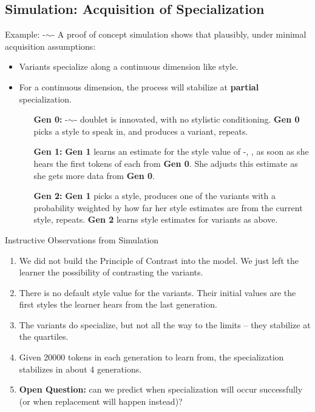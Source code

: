 \documentclass[hyperref={pdfpagelabels=false}]{beamer}
\begin{document}
\subsection{Simulation: Acquisition of Specialization}
\begin{frame}{Example: -$\sim$-}
	A proof of concept simulation shows that plausibly, under minimal acquisition assumptions:
	\begin{itemize}
	\item Variants specialize along a continuous dimension like style.
	\item For a continuous dimension, the process will stabilize at \textbf{partial} specialization. 
	\item[ ] \begin{itemize}
		\item[\textbf{Gen 0:}]  -$\sim$- doublet is innovated, with no stylistic conditioning. \textbf{Gen 0} picks a style to speak in, and produces a variant, repeats. 
		\item[\textbf{Gen 1:}]  \textbf{Gen 1} learns an estimate for the style value of -, , as soon as she hears the first tokens of each from \textbf{Gen 0}. She adjusts this estimate as she gets more data from \textbf{Gen 0}.
		\item[\textbf{Gen 2:}] \textbf{Gen 1} picks a style, produces one of the variants with a probability weighted by how far her style estimates are from the current style, repeats. \textbf{Gen 2} learns style estimates for variants as above.
	\end{itemize}
	\end{itemize}
\end{frame}


%

\begin{frame}{Instructive Observations from Simulation}
\begin{enumerate}
	\item We did not build the Principle of Contrast into the model. We just left the learner the possibility of contrasting the variants.
	\item There is no default style value for the variants. Their initial values are the first styles the learner hears from the last generation.
	\item The variants do specialize, but not all the way to the limits -- they stabilize at the quartiles.
	\item Given 20000 tokens in each generation to learn from, the specialization stabilizes in about 4 generations.%

	\item \textbf{Open Question:} can we predict when specialization will occur successfully (or when replacement will happen instead)?
\end{enumerate}
\end{frame}
\end{document}
